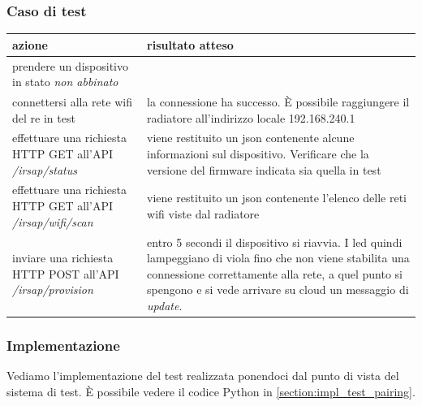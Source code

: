 \documentclass[12pt,a4paper,twoside,titlepage]{book}
\begin{document}
\subsubsection{Caso di test}
\begin{center}
\begin{tabular}{| p{} | p{} |}
    \hline 
    \textbf{azione} & \textbf{risultato atteso} \\ \hline
    prendere un dispositivo in stato \textit{non abbinato} & \\ \hline
    connettersi alla rete \Gls{wifi} del \Gls{re} in test & la connessione ha successo. È possibile raggiungere il radiatore all'indirizzo locale 192.168.240.1 \\ \hline
    effettuare una richiesta HTTP GET all'API \textit{/irsap/status} & viene restituito un \acrshort{json} contenente alcune informazioni sul dispositivo. Verificare che la versione del \gls{firmware} indicata sia quella in test \\ \hline
    effettuare una richiesta HTTP GET all'API \textit{/irsap/wifi/scan} & viene restituito un \acrshort{json} contenente l'elenco delle reti \Gls{wifi} viste dal radiatore \\ \hline
    inviare una richiesta HTTP POST all'API \textit{/irsap/provision} & entro 5 secondi il dispositivo si riavvia. I led quindi lampeggiano di viola fino che non viene stabilita una connessione correttamente alla rete, a quel punto si spengono e si vede arrivare su cloud un messaggio di \textit{update}. \\ \hline
\end{tabular}
\end{center}

\subsubsection{Implementazione}

Vediamo l'implementazione del test realizzata ponendoci dal punto di vista del sistema di test. 
È possibile vedere il codice Python in \autoref{section:impl_test_pairing}.
\end{document}
